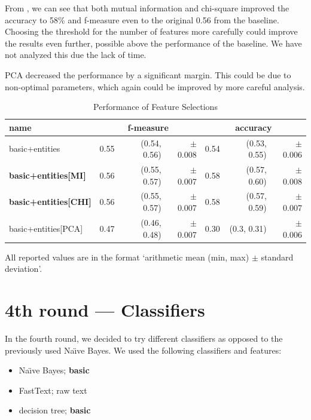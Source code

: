 From , we can see that both mutual information
and chi-square improved the accuracy to 58\% and f-measure even to the original
0.56 from the baseline.
Choosing the threshold for the number of features more carefully could improve the results even further, possible above the performance of the baseline.
We have not analyzed this due the lack of time.

PCA decreased the performance by a significant margin.
This could be due to non-optimal parameters, which
again could be improved by more careful analysis.

\begin{table}[h!]

\centering
\begin{tabular}{lr@{~}r@{~}rr@{~}r@{~}r}
\toprule
\textbf{name}	& \multicolumn{3}{c}{\textbf{f-measure}} & \multicolumn{3}{c}{\textbf{accuracy}} \\

\midrule
basic+entities & 0.55 & (0.54, 0.56) & $\pm$ 0.008 & 0.54 & (0.53, 0.55) & $\pm$ 0.006		\\
\textbf{basic+entities[MI]} & 0.56 & (0.55, 0.57) & $\pm$ 0.007 & 0.58 & (0.57, 0.60) & $\pm$ 0.008 \\
\textbf{basic+entities[CHI]} & 0.56 & (0.55, 0.57) & $\pm$ 0.007 & 0.58 & (0.57, 0.59) & $\pm$ 0.007 \\
basic+entities[PCA] & 0.47 & (0.46, 0.48) & $\pm$ 0.007 & 0.30 & (0.3, 0.31) & $\pm$ 0.006 \\


\bottomrule
\end{tabular}

\caption{Performance of Feature Selections}\label{tab:sel_perf}
All reported values are in the format `arithmetic mean (min, max) $\pm$ standard deviation'.
\end{table}

\section{4th round --- Classifiers}

In the fourth round, we decided to try different classifiers as opposed to the previously used Na\"{\i}ve Bayes.
We used the following classifiers and features:

\begin{itemize}
\item Na\"{\i}ve Bayes; \textbf{basic}
\item FastText; raw text
\item decision tree; \textbf{basic}
\end{itemize}

